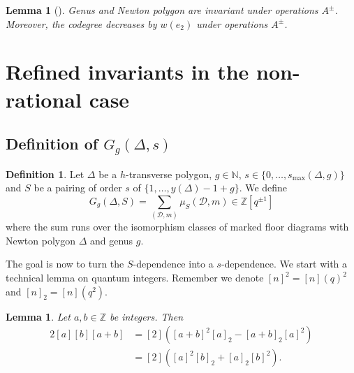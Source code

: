 \documentclass[11pt]{article}
\newtheorem{lemm}[theo]{Lemma}
\theoremstyle{definition}
\newtheorem{defi}[theo]{Definition}
\numberwithin{equation}{section}
\newcommand{\N}{\mathbb{N}}
\newcommand{\Z}{\mathbb{Z}}
\newcommand{\D}{\mathcal{D}}
\newcommand{\dsum}{\displaystyle\sum}
\newcommand{\smax}{s_{\max}}
\theoremstyle{plain}
\begin{document}
\begin{lemm}[{\cite[Lemma 3.2]{brugalle_polynomiality_2022}}]\label{lem-opeAB}
Genus and Newton polygon are invariant under operations $A^\pm$. Moreover, the codegree decreases by $w(e_2)$ under operations $A^\pm$.
\end{lemm}




\section{Refined invariants in the non-rational case}

\subsection{Definition of \texorpdfstring{$G_g(\Delta,s)$}{G\_g(Delta, s)}}



\begin{defi} \label{def-GDeltaS}
Let $\Delta$ be a $h$-transverse polygon, $g\in\N$, $s\in \{0,\dots,\smax(\Delta,g)\}$ and $S$ be a pairing  of order $s$ of $\{1,\dots, y(\Delta)-1+g \}$. We define 
\[ G_g(\Delta,S) = \dsum_{(\D,m)} \mu_S(\D,m) \in \Z[q^{\pm1}]  \]
where the sum runs over the isomorphism classes of marked floor diagrams with Newton polygon $\Delta$ and genus $g$.
\end{defi}

The goal is now to turn the $S$-dependence into a $s$-dependence. We start with a technical lemma on quantum integers. Remember we denote $[n]^2 = [n](q)^2$ and $[n]_2 = [n](q^2)$. 

\begin{lemm}\label{lem-quantum} 
Let $a,b \in\Z$ be integers. Then 
\begin{align*}
2[a][b][a+b] &= [2]\left( [a+b]^2 [a]_2 - [a+b]_2 [a]^2 \right) \\
 &= [2] \left([a]^2[b]_2 + [a]_2 [b]^2 \right).
\end{align*}
\end{lemm}
\end{document}
